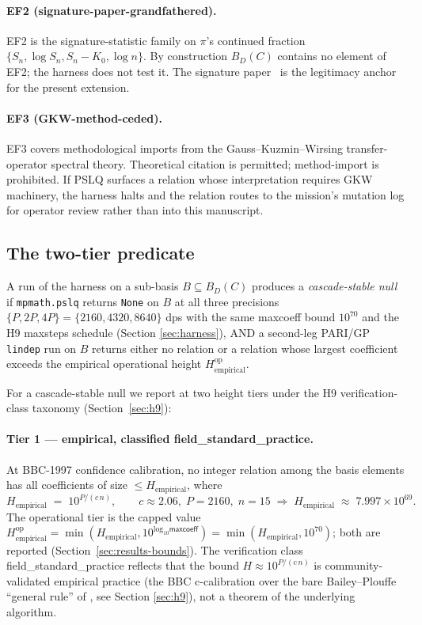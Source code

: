 \documentclass[11pt,a4paper]{article}
\newcommand{\K}{K_{0}}
\newcommand{\Hemp}{H_{\mathrm{empirical}}}
\newcommand{\Hempop}{H_{\mathrm{empirical}}^{\mathrm{op}}}
\newcommand{\BDC}{B_{D}(C)}
\newcommand{\fsp}{\textsf{field\_standard\_practice}}
\begin{document}
\paragraph{EF2 (signature-paper-grandfathered).}
EF2 is the signature-statistic family on $\pi$'s continued fraction
$\{S_{n}, \log S_{n}, S_{n}-\K, \log n\}$.
By construction $\BDC$ contains no element of EF2; the harness does not test it.
The signature paper~\cite{papanokechi2026signature} is the legitimacy anchor
for the present extension.

\paragraph{EF3 (GKW-method-ceded).}
EF3 covers methodological imports from the Gauss--Kuzmin--Wirsing transfer-operator
spectral theory.
Theoretical citation is permitted; method-import is prohibited.
If PSLQ surfaces a relation whose interpretation requires GKW machinery, the
harness halts and the relation routes to the mission's mutation log for
operator review rather than into this manuscript.

\subsection{The two-tier predicate}\label{sec:two-tier}

A run of the harness on a sub-basis $B \subseteq \BDC$ produces a
\emph{cascade-stable null} if
\texttt{mpmath.pslq} returns \texttt{None} on $B$ at all three precisions
$\{P, 2P, 4P\} = \{2160, 4320, 8640\}$ dps with the same
\textsf{maxcoeff} bound $10^{70}$ and the H9 maxsteps schedule (Section
\ref{sec:harness}), AND a second-leg PARI/GP \texttt{lindep} run on $B$
returns either no relation or a relation whose largest coefficient exceeds
the empirical operational height $\Hempop$.

For a cascade-stable null we report at two height tiers under the H9
verification-class taxonomy (Section~\ref{sec:h9}):

\paragraph{Tier 1 --- empirical, classified \fsp{}.}
At BBC-1997 confidence calibration, no integer relation among the basis
elements has all coefficients of size $\le \Hemp$, where
\begin{equation}\label{eq:Hemp}
  \Hemp \;=\; 10^{P/(c\,n)},\qquad c \approx 2.06,\;P=2160,\;n=15
  \;\Rightarrow\; \Hemp \;\approx\; 7.997\times 10^{69}.
\end{equation}
The operational tier is the capped value
$\Hempop = \min(\Hemp, 10^{\log_{10}\textsf{maxcoeff}}) = \min(\Hemp, 10^{70})$;
both are reported (Section~\ref{sec:results-bounds}).
The verification class \fsp{} reflects that the bound $H \approx 10^{P/(c\,n)}$
is community-validated empirical practice (the BBC c-calibration over the
bare Bailey--Plouffe ``general rule'' of \cite[\S 2]{bailey1998}, see Section
\ref{sec:h9}), not a theorem of the underlying algorithm.
\end{document}
